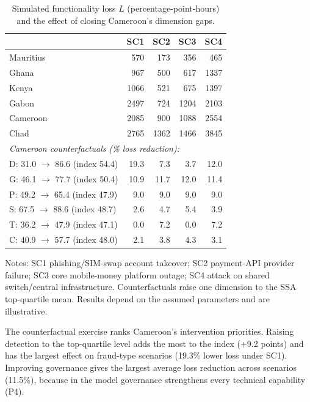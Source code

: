 \documentclass[11pt,a4paper]{article}
\begin{document}
\begin{table}[htbp]
\centering
\caption{Simulated functionality loss $L$ (percentage-point-hours) and the effect of closing Cameroon's dimension gaps.}
\label{tab:scen}
\small
\begin{threeparttable}
\begin{tabular}{l rrrr}
\toprule
 & SC1 & SC2 & SC3 & SC4 \\
\midrule
Mauritius & 570 & 173 & 356 & 465 \\
Ghana & 967 & 500 & 617 & 1337 \\
Kenya & 1066 & 521 & 675 & 1397 \\
Gabon & 2497 & 724 & 1204 & 2103 \\
Cameroon & 2085 & 900 & 1088 & 2554 \\
Chad & 2765 & 1362 & 1466 & 3845 \\
\midrule
\multicolumn{5}{l}{\textit{Cameroon counterfactuals (\% loss reduction):}} \\
\quad D: 31.0 $\rightarrow$ 86.6 (index 54.4) & 19.3 & 7.3 & 3.7 & 12.0 \\
\quad G: 46.1 $\rightarrow$ 77.7 (index 50.4) & 10.9 & 11.7 & 12.0 & 11.4 \\
\quad P: 49.2 $\rightarrow$ 65.4 (index 47.9) & 9.0 & 9.0 & 9.0 & 9.0 \\
\quad S: 67.5 $\rightarrow$ 88.6 (index 48.7) & 2.6 & 4.7 & 5.4 & 3.9 \\
\quad T: 36.2 $\rightarrow$ 47.9 (index 47.1) & 0.0 & 7.2 & 0.0 & 7.2 \\
\quad C: 40.9 $\rightarrow$ 57.7 (index 48.0) & 2.1 & 3.8 & 4.3 & 3.1 \\
\bottomrule
\end{tabular}
\begin{tablenotes}\footnotesize
\item Notes: SC1 phishing/SIM-swap account takeover; SC2 payment-API provider failure; SC3 core mobile-money platform outage; SC4 attack on shared switch/central infrastructure. Counterfactuals raise one dimension to the SSA top-quartile mean. Results depend on the assumed parameters and are illustrative.
\end{tablenotes}
\end{threeparttable}
\end{table}

The counterfactual exercise ranks Cameroon's intervention priorities. Raising detection to the top-quartile level adds the most to the index (+9.2 points) and has the largest effect on fraud-type scenarios (19.3\% lower loss under SC1). Improving governance gives the largest average loss reduction across scenarios (11.5\%), because in the model governance strengthens every technical capability (P4).
\end{document}
